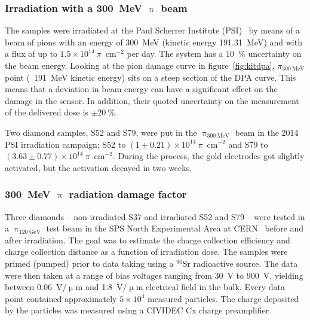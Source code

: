 \subsubsection{Irradiation with a 300~MeV $\uppi$  beam}
The samples were irradiated at the Paul Scherrer Institute (PSI)~\cite{PSI:00000} by means of a beam of pions with an energy of 300~MeV (kinetic energy 191.31~MeV) and with a flux of up to $1.5\times10^{14}~\pi$~cm$^{-2}$ per day. The system has a 10~\% uncertainty on the beam energy. Looking at the pion damage curve in figure~\ref{fig:kitdpa}, $\pi_{\mathrm{300~MeV}}$ point (~191~MeV kinetic energy) sits on a steep section of the DPA curve. This means that a deviation in beam energy can have a significant effect on the damage in the sensor. In addition, their quoted uncertainty on the measurement of the delivered dose is $\pm20~\%$.

Two diamond samples, S52 and S79, were put in the $\uppi_\mathrm{300~MeV}$ beam in the 2014 PSI irradiation campaign; S52 to $(1\pm0.21)\times10^{14}~\pi$~cm$^{-2}$ and S79 to $(3.63\pm0.77)\times10^{14}~\pi$~cm$^{-2}$. During the process, the gold electrodes got slightly activated, but the activation decayed in two weeks.

\subsubsection{300~MeV $\uppi$ radiation damage factor}
Three diamonds -- non-irradiated S37 and irradiated S52 and S79 -- were tested in a $\uppi_\mathrm{120~GeV}$ test beam in the SPS North Experimental Area at CERN~\cite{Brianti:604383} before and after irradiation. The goal was to estimate the charge collection efficiency and charge collection distance as a function of irradiation dose. The samples were primed (pumped) prior to data taking using a $^{90}$Sr radioactive source. The data were then taken at a range of bias voltages ranging from 30~V to 900~V, yielding between 0.06~V/$\upmu$m and 1.8~V/$\upmu$m electrical field in the bulk. Every data point contained approximately $5\times10^4$ measured particles. The charge deposited by the particles was measured using a CIVIDEC Cx charge preamplifier. 

